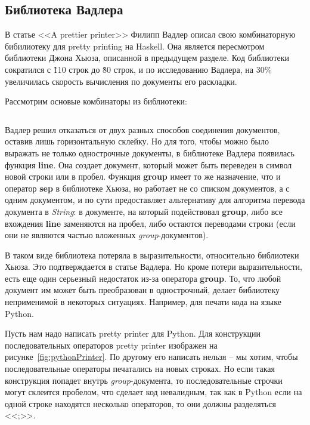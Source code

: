 \newpage

\subsection{Библиотека Вадлера}

В статье <<A prettier printer>>\cite{wadler} Филипп Вадлер описал свою комбинаторную бибилиотеку для pretty printing на Haskell. Она является пересмотром библиотеки Джона Хьюза, описанной в предыдущем разделе. Код библиотеки сократился с \~110 строк до \~80 строк, и по исследованию Вадлера, на 30\% увеличилась скорость вычисления по документы его раскладки.

Рассмотрим основые комбинаторы из библиотеки:
\inputminted{haskell}{codes/wadlerBasicOperations.hs}

Вадлер решил отказаться от двух разных способов соединения документов, оставив лишь горизонтальную склейку. Но для того, чтобы можно было выражать не только однострочные документы, в библиотеке Вадлера появилась функция \textbf{line}. Она создает документ, который может быть переведен в символ новой строки или в пробел.
Функция \textbf{group} имеет то же назначение, что и оператор \textbf{sep} в библиотеке Хьюза, но работает не со списком документов, а с одним документом, и по сути предоставляет альтернативу для алгоритма перевода документа в \textit{String}: в документе, на который подействовал \textbf{group}, либо все вхождения \textbf{line} заменяются на пробел, либо остаются переводами строки (если они не являются частью вложенных \textit{group}-документов).

В таком виде библиотека потеряла в выразительности, относительно библиотеки Хьюза. Это подтверждается в статье Вадлера. Но кроме потери выразительности, есть еще один серьезный недостаток из-за оператора \textbf{group}. То, что любой документ им может быть преобразован в однострочный, делает библиотеку неприменимой в некоторых ситуациях. Например, для печати кода на языке Python.

Пусть нам надо написать pretty printer для Python. Для конструкции последовательных операторов pretty printer изображен на рисунке~\ref{fig:pythonPrinter}.
По другому его написать нельзя -- мы хотим, чтобы последовательные операторы печатались на новых строках. Но если такая конструкция попадет внутрь \textit{group}-документа, то последовательные строчки могут склеится пробелом, что сделает код невалидным, так как в Python если на одной строке находятся несколько операторов, то они должны разделяться <<;>>.

